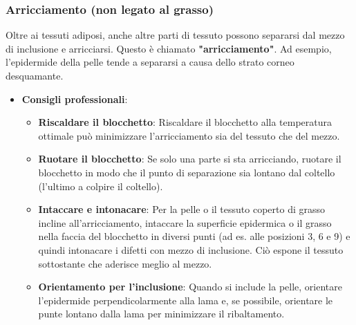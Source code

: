 \subsubsection{Arricciamento (non legato al grasso)}
Oltre ai tessuti adiposi, anche altre parti di tessuto possono separarsi dal mezzo di inclusione e arricciarsi.  Questo è chiamato \textbf{"arricciamento"}. Ad esempio, l'epidermide della pelle tende a separarsi a causa dello strato corneo desquamante. 
\begin{itemize}
    \item   \textbf{Consigli professionali}:
    \begin{itemize}
        \item   \textbf{Riscaldare il blocchetto}: Riscaldare il blocchetto alla temperatura ottimale può minimizzare l'arricciamento sia del tessuto che del mezzo. 
        \item   \textbf{Ruotare il blocchetto}: Se solo una parte si sta arricciando, ruotare il blocchetto in modo che il punto di separazione sia lontano dal coltello (l'ultimo a colpire il coltello). 
        \item   \textbf{Intaccare e intonacare}: Per la pelle o il tessuto coperto di grasso incline all'arricciamento, intaccare la superficie epidermica o il grasso nella faccia del blocchetto in diversi punti (ad es. alle posizioni 3, 6 e 9) e quindi intonacare i difetti con mezzo di inclusione.  Ciò espone il tessuto sottostante che aderisce meglio al mezzo. 
        \item   \textbf{Orientamento per l'inclusione}: Quando si include la pelle, orientare l'epidermide perpendicolarmente alla lama e, se possibile, orientare le punte lontano dalla lama per minimizzare il ribaltamento. 
    \end{itemize}
\end{itemize}

